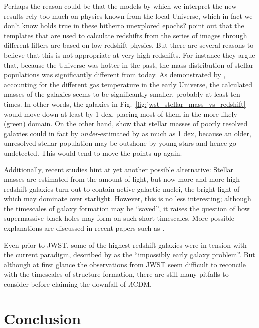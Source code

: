 \documentclass[useAMS]{aa}
\begin{document}
Perhaps the reason could be that the models by which we interpret the new results rely too much on physics known from the local Universe, which in fact we don't know holds true in these hitherto unexplored epochs?
\citet{Steinhardt2022} point out that the templates that are used to calculate redshifts from the series of images through different filters are based on low-redshift physics.
But there are several reasons to believe that this is not appropriate at very high redshifts.
For instance they argue that, because the Universe was hotter in the past, the mass distribution of stellar populations was significantly different from today.
As demonstrated by \citet{Sneppen2022}, accounting for the different gas temperature in the early Universe, the calculated masses of the galaxies seems to be significantly smaller, probably at least ten times.
In other words, the galaxies in Fig.~\ref{fig:jwst_stellar_mass_vs_redshift} would move down at least by 1 dex, placing most of them in the more likely (green) domain.
On the other hand, \citet{Gimenez-Arteaga2022} show that stellar masses of poorly resolved galaxies could in fact by \emph{under}-estimated by as much as 1 dex, because an older, unresolved stellar population may be outshone by young stars and hence go undetected.
This would tend to move the points up again.

Additionally, recent studies \citep[e.g.][]{Kocevski2023,Larson2023} hint at yet another possible alternative: Stellar masses are estimated from the amount of light, but now more and more high-redshift galaxies turn out to contain active galactic nuclei, the bright light of which may dominate over starlight. However, this is no less interesting; although the timescales of galaxy formation may be ``saved'', it raises the question of how supermassive black holes may form on such short timescales.
More possible explanations are discussed in recent papers such as \citet{Kannan2022}.

Even prior to JWST, some of the highest-redshift galaxies were in tension with the current paradigm, described by \citet{Steinhardt2016} as the ``impossibly early galaxy problem''.
But although at first glance the observations from JWST seem difficult to reconcile with the timescales of structure formation, there are still many pitfalls to consider before claiming the downfall of $\Lambda$CDM.

\section{Conclusion}
\label{sec:conclusion}
\end{document}

